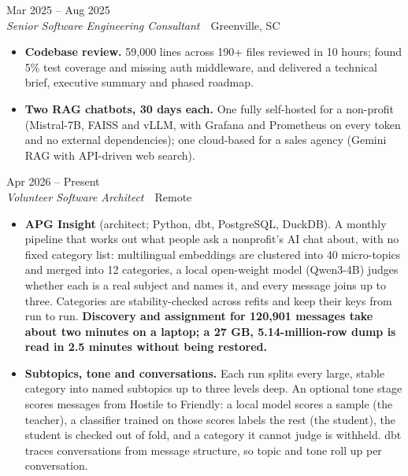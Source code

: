 \documentclass[10pt,letterpaper]{article}
\newcommand{\szmeta}{\fontsize{8pt}{10pt}\selectfont}
\begin{document}
\vspace{3pt}
 \hfill {\color{muted}\szmeta Mar 2025 – Aug 2025}\\[1pt]
{\itshape Senior Software Engineering Consultant}{\color{muted}\ \textbullet\ Greenville, SC}
\vspace{2pt}
\begin{itemize}
\item \textbf{Codebase review.} 59,000 lines across 190+ files reviewed in 10 hours; found 5\% test coverage and missing auth middleware, and delivered a technical brief, executive summary and phased roadmap.
\item \textbf{Two RAG chatbots, 30 days each.} One fully self-hosted for a non-profit (Mistral-7B, FAISS and vLLM, with Grafana and Prometheus on every token and no external dependencies); one cloud-based for a sales agency (Gemini RAG with API-driven web search).
\end{itemize}
\vspace{3pt}
 \hfill {\color{muted}\szmeta Apr 2026 – Present}\\[1pt]
{\itshape Volunteer Software Architect}{\color{muted}\ \textbullet\ Remote}
\vspace{2pt}
\begin{itemize}
\item \textbf{APG Insight} {\color{muted}(architect; Python, dbt, PostgreSQL, DuckDB)}. A monthly pipeline that works out what people ask a nonprofit's AI chat about, with no fixed category list: multilingual embeddings are clustered into 40 micro-topics and merged into 12 categories, a local open-weight model (Qwen3-4B) judges whether each is a real subject and names it, and every message joins up to three. Categories are stability-checked across refits and keep their keys from run to run. \textbf{Discovery and assignment for 120,901 messages take about two minutes on a laptop; a 27 GB, 5.14-million-row dump is read in 2.5 minutes without being restored.}
\item \textbf{Subtopics, tone and conversations.} Each run splits every large, stable category into named subtopics up to three levels deep. An optional tone stage scores messages from Hostile to Friendly: a local model scores a sample (the teacher), a classifier trained on those scores labels the rest (the student), the student is checked out of fold, and a category it cannot judge is withheld. dbt traces conversations from message structure, so topic and tone roll up per conversation.
\end{itemize}
\end{document}
